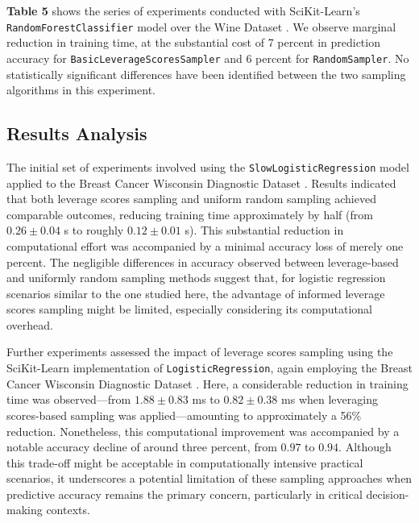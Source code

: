 \documentclass{article}
\theoremstyle{plain}
\theoremstyle{definition}
\theoremstyle{remark}
\begin{document}
\textbf{Table 5} shows the series of experiments conducted with SciKit-Learn's \texttt{RandomForestClassifier} model over the Wine Dataset \cite{wine}. We observe marginal reduction in training time, at the substantial cost of 7 percent in prediction accuracy for \texttt{BasicLeverageScoresSampler} and 6 percent for \texttt{RandomSampler}. No statistically significant differences have been identified between the two sampling algorithms in this experiment.


\subsection{Results Analysis}

The initial set of experiments involved using the \texttt{SlowLogisticRegression} model applied to the Breast Cancer Wisconsin Diagnostic Dataset \cite{breastcancer}. Results indicated that both leverage scores sampling and uniform random sampling achieved comparable outcomes, reducing training time approximately by half (from $0.26 \pm 0.04$ s to roughly $0.12 \pm 0.01$ s). This substantial reduction in computational effort was accompanied by a minimal accuracy loss of merely one percent. The negligible differences in accuracy observed between leverage-based and uniformly random sampling methods suggest that, for logistic regression scenarios similar to the one studied here, the advantage of informed leverage scores sampling might be limited, especially considering its computational overhead.

Further experiments assessed the impact of leverage scores sampling using the SciKit-Learn implementation of \texttt{LogisticRegression}, again employing the Breast Cancer Wisconsin Diagnostic Dataset \cite{breastcancer}. Here, a considerable reduction in training time was observed—from $1.88 \pm 0.83$ ms to $0.82 \pm 0.38$ ms when leveraging scores-based sampling was applied—amounting to approximately a 56\% reduction. Nonetheless, this computational improvement was accompanied by a notable accuracy decline of around three percent, from $0.97$ to $0.94$. Although this trade-off might be acceptable in computationally intensive practical scenarios, it underscores a potential limitation of these sampling approaches when predictive accuracy remains the primary concern, particularly in critical decision-making contexts.
\end{document}
